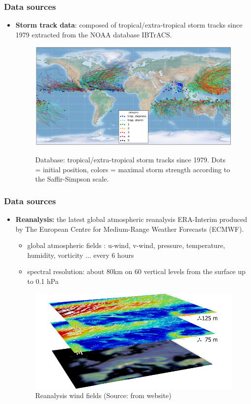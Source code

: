 \documentclass{beamer}
\begin{document}
\begin{frame}
\frametitle{Data sources}
\begin{itemize}
	\item  \textbf{Storm track data}: composed of tropical/extra-tropical storm tracks since 1979 extracted from the NOAA database IBTrACS. \\
	\begin{figure}
		\includegraphics[width=0.7\linewidth, height=0.5\textheight]{figs/all_storms.png}
		\label{fig: storm_tracks}
		\caption{Database: tropical/extra-tropical storm tracks since 1979. Dots = initial position, colors = maximal storm strength according to the Saffir-Simpson scale.}
	\end{figure}
\end{itemize}
\end{frame}

\begin{frame}
\frametitle{Data sources}
\begin{itemize}
	\item \textbf{Reanalysis:} the latest global atmospheric reanalysis ERA-Interim produced by The European Centre for Medium-Range Weather Forecasts (ECMWF). 
	\begin{itemize}
		\item global atmospheric fields : u-wind, v-wind, pressure, temperature, humidity, vorticity ... every 6 hours
		\item spectral resolution: about 80km on 60 vertical levels from the surface up to 0.1 hPa
	\end{itemize}
	\begin{figure}
		\includegraphics[width=0.7\linewidth, height=0.4\textheight]{figs/Reanalysis-Data-Wind-Speed.png}
		\caption{Reanalysis wind fields (Source: from website)}
	\end{figure}
\end{itemize}
\end{frame}
\end{document}
